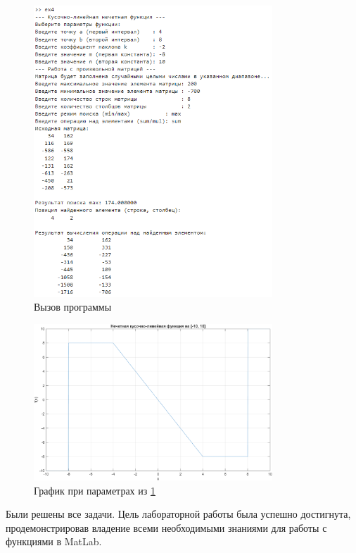 \begin{figure}[hbt]
    \centering
    \includegraphics[width=0.8\textwidth]{figs/result.png}
    \caption{Вызов программы}
    \label{fig:result.png}
\end{figure}

\begin{figure}[hb]
    \centering
    \includegraphics[width=0.8\textwidth]{figs/result_figure.png}
    \caption{График при параметрах из \cref{fig:result.png}}
    \label{fig:result_figure.png}
\end{figure}

Были решены все задачи. Цель лабораторной работы была успешно достигнута, продемонстрировав владение всеми необходимыми знаниями для работы с функциями в MatLab.